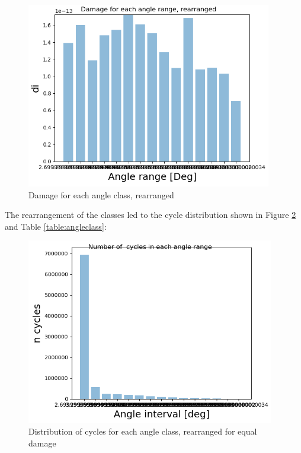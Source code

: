 \begin{figure}[H]
\centering
\includegraphics[scale=0.9]{figures/newdam}
\caption[Damage for each angle class, rearranged]{Damage for each angle class, rearranged}
 \label{fig:newdam}
\end{figure}

The rearrangement of the classes led to the cycle distribution shown in Figure \ref{fig:newcyc} and Table \ref{table:angleclass}:

\begin{figure}[H]
\centering
\includegraphics[scale=1]{figures/newcyc}
\caption[Distribution of cycles for each angle class, rearranged for equal damage]{Distribution of cycles for each angle class, rearranged for equal damage}
 \label{fig:newcyc}
\end{figure}

